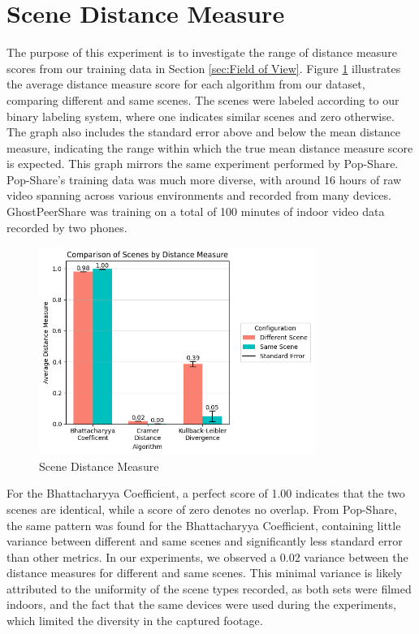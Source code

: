 \section{Scene Distance Measure}
\label{sec:Scene Distance Measure}

The purpose of this experiment is to investigate the range of distance measure scores from our training data in Section \ref{sec:Field of View}. Figure \ref{fig:scene-distance-measure} illustrates the average distance measure score for each algorithm from our dataset, comparing different and same scenes. The scenes were labeled according to our binary labeling system, where one indicates similar scenes and zero otherwise. The graph also includes the standard error above and below the mean distance measure, indicating the range within which the true mean distance measure score is expected. This graph mirrors the same experiment performed by Pop-Share. Pop-Share's training data was much more diverse, with around 16 hours of raw video spanning across various environments and recorded from many devices. GhostPeerShare was training on a total of 100 minutes of indoor video data recorded by two phones.

\begin{figure}[t]
    \centering
    \includegraphics[width=0.8\textwidth]{5 Results/Figures/5.4 Bar Chart.png}
    \caption{Scene Distance Measure}
    \label{fig:scene-distance-measure}
\end{figure}

For the Bhattacharyya Coefficient, a perfect score of 1.00 indicates that the two scenes are identical, while a score of zero denotes no overlap. From Pop-Share, the same pattern was found for the Bhattacharyya Coefficient, containing little variance between different and same scenes and significantly less standard error than other metrics. In our experiments, we observed a 0.02 variance between the distance measures for different and same scenes. This minimal variance is likely attributed to the uniformity of the scene types recorded, as both sets were filmed indoors, and the fact that the same devices were used during the experiments, which limited the diversity in the captured footage.

